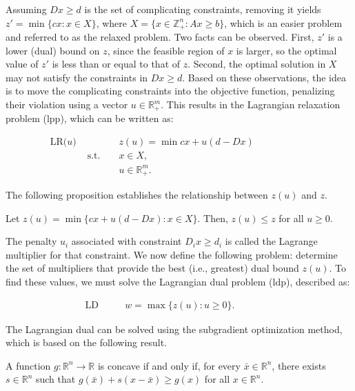 Assuming $Dx \geq d$ is the set of complicating constraints, removing it yields
$z' = \min \{cx : x \in X\}$, where $X = \{x \in \mathbb{Z}^n_+ : Ax \geq b\}$,
which is an easier problem and referred to as the relaxed problem. Two facts can
be observed. First, $z'$ is a lower (dual) bound on $z$, since the feasible
region of $x$ is larger, so the optimal value of $z'$ is less than or equal to
that of $z$. Second, the optimal solution in $X$ may not satisfy the constraints
in $Dx \geq d$. Based on these observations, the idea is to move the
complicating constraints into the objective function, penalizing their violation
using a vector $u \in \mathbb{R}^{m}_+$. This results in the Lagrangian
relaxation problem (\gls{lpp}), which can be written as:

\begin{align*}
	\text{LR($u$) } &              &  & z(u) = \min cx + u(d - Dx) &  &  &  &  &  &  & \\
	                & \text{s.t. } &  & x \in X,                   &  &  &  &  &  &  & \\
	                &              &  & u \in \mathbb{R}^m_+.      &  &  &  &  &  &  &
\end{align*}

The following proposition establishes the relationship between $z(u)$ and $z$.

\begin{proposition}
	Let $z(u) = \min \{cx + u (d - Dx) : x \in X\}$. Then, $z(u) \leq z$ for all $u \geq 0$.
\end{proposition}

The penalty $u_i$ associated with constraint $D_ix \geq d_i$ is called the
Lagrange multiplier for that constraint. We now define the following problem:
determine the set of multipliers that provide the best (i.e., greatest) dual
bound $z(u)$. To find these values, we must solve the Lagrangian dual problem
(\gls{ldp}), described as:

\begin{align*}
	\text{LD } &  &  & w = \max \{z(u) : u \geq 0\}. &  &  &  &  &
\end{align*}

The Lagrangian dual can be solved using the subgradient optimization method,
which is based on the following result.

\begin{proposition} \label{proposition:convex}
	A function $g : \mathbb{R}^n \rightarrow \mathbb{R}$ is concave if and only if, for every $\bar{x} \in \mathbb{R}^n$, there exists $s \in \mathbb{R}^n$ such that $g(\bar{x}) + s(x - \bar{x}) \geq g(x)$ for all $x \in \mathbb{R}^n$.
\end{proposition}


